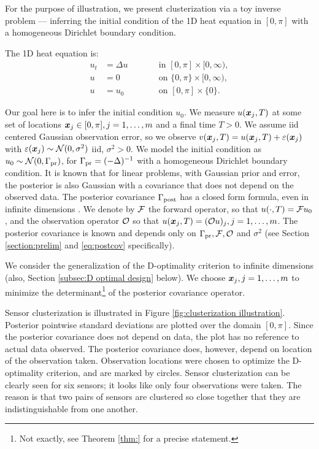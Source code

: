 For the purpose of illustration, we present clusterization via a toy
inverse problem --- inferring the initial condition of the 1D heat
equation in $[0,\pi]$ with a homogeneous Dirichlet boundary condition.

The 1D heat equation is:
\begin{subequations}\label{eq:heat equation}
  \begin{alignat}{2}
    u_t &= \Delta u &&\qquad \text{in } [0,\pi] \times [0,\infty),\\
      u &= 0 &&\qquad \text{on } \{0, \pi\} \times [0,\infty),\\
        u &= u_0 &&\qquad \text{on }[0,\pi] \times \{0\}.
  \end{alignat}
\end{subequations}

Our goal here is to infer the initial condition $u_0$. We measure
$u({\boldsymbol{x}}_j, T)$ at some set of locations ${\boldsymbol{x}}_j \in [0,\pi], j=1, \dots,m$
and a final time $T > 0$. We assume iid centered Gaussian observation
error, so we observe $v({\boldsymbol{x}}_j,T) = u({\boldsymbol{x}}_j,T) + \varepsilon({\boldsymbol{x}}_j)$ with
$\varepsilon({\boldsymbol{x}}_j) \sim \mathcal{N}(0, \sigma^2)$ iid, $\sigma^2 > 0$. We model
the initial condition as $u_0 \sim \mathcal{N}(0,\Gamma_{\textup{pr}})$, for $\Gamma_{\textup{pr}} =
(-\Delta)^{-1}$ with a homogeneous Dirichlet boundary condition. It is
known \cite{Tarantola05} that for linear problems, with Gaussian prior
and error, the posterior is also Gaussian with a covariance that does
not depend on the observed data. The posterior covariance $\Gamma_{\textup{post}}$
has a closed form formula, even in infinite dimensions
\cite{Stuart10}. We denote by $\mathcal{F}$ the forward operator, so that $u(
\cdot,T) = \mathcal{F} u_0$, and the observation operator $\mathcal{O}$ so that
$u({\boldsymbol{x}}_j,T) = (\mathcal{O} u)_j, j=1,\dots,m$. The posterior covariance is
known and depends only on $\Gamma_{\textup{pr}}, \mathcal{F}, \mathcal{O}$ and $\sigma^2$ (see
Section \ref{section:prelim} and \eqref{eq:postcov} specifically).

We consider the generalization of the D-optimality criterion to
infinite dimensions \cite{AlexanderianGloorGhattas14} (also, Section
\ref{subsec:D optimal design} below). We choose ${\boldsymbol{x}}_j,j=1,\dots,m$ to
minimize the determinant\footnote{Not exactly, see Theorem \ref{thm:}
for a precise statement.} of the posterior covariance operator.

Sensor clusterization is illustrated in Figure \ref{fig:clusterization
  illustration}. Posterior pointwise standard deviations are plotted
over the domain $[0, \pi]$. Since the posterior covariance does not
depend on data, the plot has no reference to actual data observed. The
posterior covariance does, however, depend on location of the
observation taken. Observation locations were chosen to optimize the
D-optimality criterion, and are marked by circles. Sensor
clusterization can be clearly seen for six sensors; it looks like only
four observations were taken. The reason is that two pairs of sensors
are clustered so close together that they are indistinguishable from
one another.


